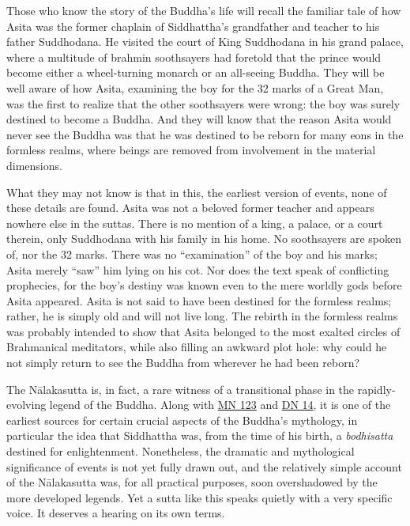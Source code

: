 \documentclass[12pt,openany]{book}%
\begin{document}
Those who know the story of the Buddha’s life will recall the familiar tale of how Asita was the former chaplain of Siddhattha’s grandfather and teacher to his father Suddhodana. He visited the court of King Suddhodana in his grand palace, where a multitude of brahmin soothsayers had foretold that the prince would become either a wheel-turning monarch or an all-seeing Buddha. They will be well aware of how Asita, examining the boy for the 32 marks of a Great Man, was the first to realize that the other soothsayers were wrong: the boy was surely destined to become a Buddha. And they will know that the reason Asita would never see the Buddha was that he was destined to be reborn for many eons in the formless realms, where beings are removed from involvement in the material dimensions.

What they may not know is that in this, the earliest version of events, none of these details are found. Asita was not a beloved former teacher and appears nowhere else in the suttas. There is no mention of a king, a palace, or a court therein, only Suddhodana with his family in his home. No soothsayers are spoken of, nor the 32 marks. There was no “examination” of the boy and his marks; Asita merely “saw” him lying on his cot. Nor does the text speak of conflicting prophecies, for the boy’s destiny was known even to the mere worldly gods before Asita appeared. Asita is not said to have been destined for the formless realms; rather, he is simply old and will not live long. The rebirth in the formless realms was probably intended to show that Asita belonged to the most exalted circles of Brahmanical meditators, while also filling an awkward plot hole: why could he not simply return to see the Buddha from wherever he had been reborn?

The \textsanskrit{Nālakasutta} is, in fact, a rare witness of a transitional phase in the rapidly-evolving legend of the Buddha. Along with \href{https://suttacentral.net/mn123/en/sujato}{MN 123} and \href{https://suttacentral.net/dn14/en/sujato}{DN 14}, it is one of the earliest sources for certain crucial aspects of the Buddha’s mythology, in particular the idea that Siddhattha was, from the time of his birth, a \textit{bodhisatta} destined for enlightenment. Nonetheless, the dramatic and mythological significance of events is not yet fully drawn out, and the relatively simple account of the \textsanskrit{Nālakasutta} was, for all practical purposes, soon overshadowed by the more developed legends. Yet a sutta like this speaks quietly with a very specific voice. It deserves a hearing on its own terms.
\end{document}

